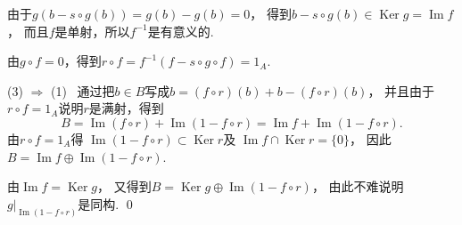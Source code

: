 \begin{enumerate}
     由于$g(b-s\circ g(b))=g(b)-g(b)=0$，
     得到$b-s\circ g(b)\in\operatorname{Ker}g=\operatorname{Im}f$，
     而且$f$是单射，所以$f^{-1}$是有意义的.

     由$g\circ f=0$，得到$r\circ f= f^{-1}(f-s\circ g\circ f)=1_A$.

    (3) $\Rightarrow$ (1)
    \ 通过把$b\in B$写成$b=(f\circ r)(b)+b-(f\circ r)(b)$，
    并且由于$r\circ f=1_A$说明$r$是满射，得到
    $$B=\operatorname{Im}(f\circ r)+ \operatorname{Im}(1-f\circ r)
    = \operatorname{Im}f+ \operatorname{Im}(1-f\circ r).$$
    由$r\circ f=1_A$得
    $\operatorname{Im}(1-f\circ r)\subset\operatorname{Ker}r$及
    $\operatorname{Im}f\cap\operatorname{Ker}r=\{0\}$，
    因此$B=\operatorname{Im}f\oplus\operatorname{Im}(1-f\circ r)$.

    由$\operatorname{Im}f=\operatorname{Ker}g$，
    又得到$B=\operatorname{Ker}g\oplus\operatorname{Im}(1-f\circ r)$，
    由此不难说明$g|_{\operatorname{Im}(1-f\circ r)}$是同构. \qed
\end{enumerate}